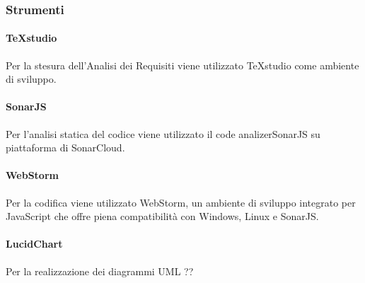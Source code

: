 \subsubsection{Strumenti}
\paragraph{TeXstudio}
Per la stesura dell'Analisi dei Requisiti viene utilizzato TeXstudio come ambiente di sviluppo.
\paragraph{SonarJS}
Per l'analisi statica del codice viene utilizzato il code analizer\glosp SonarJS su piattaforma di SonarCloud.
\paragraph{WebStorm}
Per la codifica viene utilizzato WebStorm, un ambiente di sviluppo integrato per JavaScript che offre piena compatibilità con Windows, Linux e SonarJS.
\paragraph{LucidChart}
Per la realizzazione dei diagrammi UML ??	